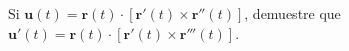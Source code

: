 \item Si $\mathbf{u}(t) = \mathbf{r}(t) \cdot [\mathbf{r}'(t) \times \mathbf{r}''(t)]$, demuestre que $\mathbf{u}'(t) = \mathbf{r}(t) \cdot [\mathbf{r}'(t) \times \mathbf{r}'''(t)]$.
